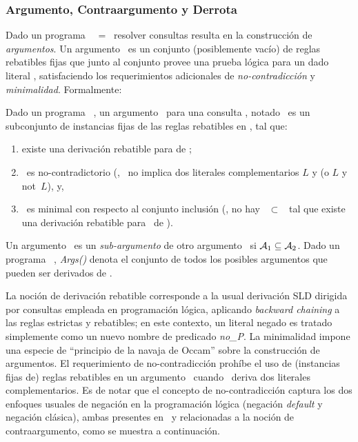 \subsubsection{Argumento, Contraargumento y Derrota}

Dado un programa \DLP\ \PP\ = \SD\, resolver consultas resulta en la construcción de \textit{argumentos}.
Un argumento \ArgA\ es un conjunto (posiblemente vacío) de reglas rebatibles fijas que junto al conjunto \SSet
provee una prueba lógica para un dado literal \ArgQ, satisfaciendo los requerimientos adicionales de 
\textit{no-contradicción} y \textit{minimalidad}. Formalmente:

\begin{definicion}[Argumento]
	Dado un programa \DLP\ \PP, un argumento \ArgA\ para una consulta \ArgQ, notado \AQ\, es un subconjunto de 
	instancias fijas de las reglas rebatibles en \PP, tal que:
	
	\begin{enumerate}[(1)]
		\item existe una derivación rebatible para \ArgQ de \SyA;
		\item \SyA\ es no-contradictorio (\ie, \SyA\ no implica dos literales complementarios $L$ y 
		(o $L$ y \textsf{not}\ $L$), y,		
		\item \ArgA\ es minimal con respecto al conjunto inclusión (\ie, no hay \Ap\ $\subset$ \ArgA\ tal que
		existe una derivación rebatible para \ArgQ\ de \SyAp).
	\end{enumerate}
	
\end{definicion}

Un argumento \AaQa\ es un \textit{sub-argumento} de otro argumento \AbQb\ si $\mbox{${\mathcal A_1}$} \subseteq \mbox{${\mathcal A_2}$}$.
Dado un programa \DLP\ \PP, \textit{Args(\PP)} denota el conjunto de todos los posibles argumentos que 
pueden ser derivados de \PP.

La noción de derivación rebatible corresponde a la usual derivación SLD dirigida por consultas
empleada en programación lógica, aplicando \textit{backward chaining} a las reglas estrictas y rebatibles;
en este contexto, un literal negado  es tratado simplemente como un nuevo nombre de predicado \textit{no\_P}. La minimalidad impone una especie de ``principio de la navaja de Occam'' sobre la construcción 
de argumentos. El requerimiento de no-contradicción prohíbe el uso de (instancias fijas de) reglas rebatibles
en un argumento \ArgA\ cuando \SyA\ deriva dos literales complementarios. Es de notar que el concepto de no-contradicción captura los dos enfoques usuales de negación en la programación lógica (negación \textit{default}
y negación clásica), ambas presentes en \DLP\ y relacionadas a la noción de contraargumento, como se muestra a continuación.

